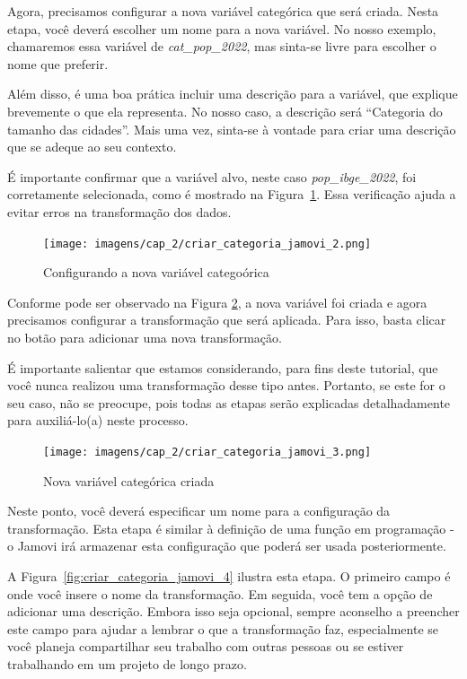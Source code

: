 Agora, precisamos configurar a nova variável categórica que será criada. Nesta etapa, você deverá escolher um nome para a nova variável. No nosso exemplo, chamaremos essa variável de \textit{cat\_pop\_2022}, mas sinta-se livre para escolher o nome que preferir. 

Além disso, é uma boa prática incluir uma descrição para a variável, que explique brevemente o que ela representa. No nosso caso, a descrição será ``Categoria do tamanho das cidades''. Mais uma vez, sinta-se à vontade para criar uma descrição que se adeque ao seu contexto.

É importante confirmar que a variável alvo, neste caso \textit{pop\_ibge\_2022}, foi corretamente selecionada, como é mostrado na Figura~\ref{fig:criar_categoria_jamovi_2}. Essa verificação ajuda a evitar erros na transformação dos dados.

\begin{figure}[H]
    \centering
    \caption{Configurando a nova variável categoórica}
    \texttt{[image: imagens/cap\_2/criar\_categoria\_jamovi\_2.png]}
    \label{fig:criar_categoria_jamovi_2}
\end{figure}

Conforme pode ser observado na Figura \ref{fig:criar_categoria_jamovi_3}, a nova variável foi criada e agora precisamos configurar a transformação que será aplicada. Para isso, basta clicar no botão para adicionar uma nova transformação.

É importante salientar que estamos considerando, para fins deste tutorial, que você nunca realizou uma transformação desse tipo antes. Portanto, se este for o seu caso, não se preocupe, pois todas as etapas serão explicadas detalhadamente para auxiliá-lo(a) neste processo.

\begin{figure}[H]
    \centering
    \caption{Nova variável categórica criada}
    \texttt{[image: imagens/cap\_2/criar\_categoria\_jamovi\_3.png]}
    \label{fig:criar_categoria_jamovi_3}
\end{figure}

Neste ponto, você deverá especificar um nome para a configuração da transformação. Esta etapa é similar à definição de uma função em programação - o Jamovi irá armazenar esta configuração que poderá ser usada posteriormente.

A Figura~\ref{fig:criar_categoria_jamovi_4} ilustra esta etapa. O primeiro campo é onde você insere o nome da transformação. Em seguida, você tem a opção de adicionar uma descrição. Embora isso seja opcional, sempre aconselho a preencher este campo para ajudar a lembrar o que a transformação faz, especialmente se você planeja compartilhar seu trabalho com outras pessoas ou se estiver trabalhando em um projeto de longo prazo.

